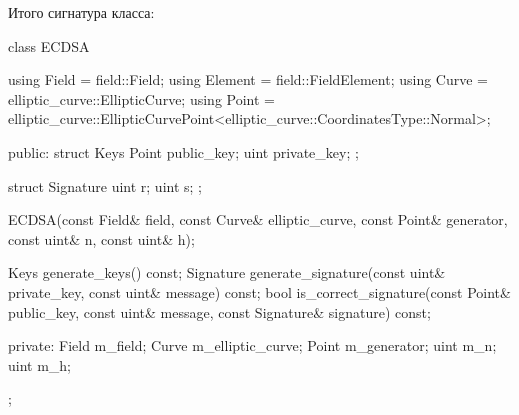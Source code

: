 Итого сигнатура класса:
\begin{cppcode}
class ECDSA {
    using Field = field::Field;
    using Element = field::FieldElement;
    using Curve = elliptic_curve::EllipticCurve;
    using Point = elliptic_curve::EllipticCurvePoint<elliptic_curve::CoordinatesType::Normal>;

public:
    struct Keys {
        Point public_key;
        uint private_key;
    };

    struct Signature {
        uint r;
        uint s;
    };

    ECDSA(const Field& field, const Curve& elliptic_curve, const Point& generator, const uint& n,
          const uint& h);

    Keys generate_keys() const;
    Signature generate_signature(const uint& private_key, const uint& message) const;
    bool is_correct_signature(const Point& public_key, const uint& message,
                              const Signature& signature) const;

private:
    Field m_field;
    Curve m_elliptic_curve;
    Point m_generator;
    uint m_n;
    uint m_h;
};
\end{cppcode}

